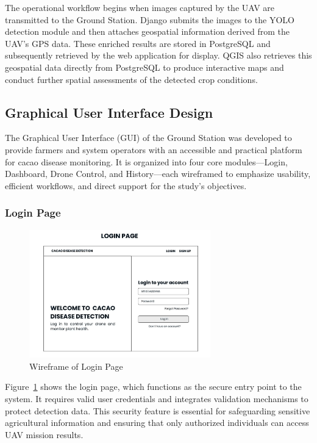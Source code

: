 The operational workflow begins when images captured by the UAV are transmitted to the Ground Station. Django submits the images to the YOLO detection module and then attaches geospatial information derived from the UAV’s GPS data. These enriched results are stored in PostgreSQL and subsequently retrieved by the web application for display. QGIS also retrieves this geospatial data directly from PostgreSQL to produce interactive maps and conduct further spatial assessments of the detected crop conditions.

\subsection*{Graphical User Interface Design}

The Graphical User Interface (GUI) of the Ground Station was developed to provide farmers and system operators with an accessible and practical platform for cacao disease monitoring. It is organized into four core modules—Login, Dashboard, Drone Control, and History—each wireframed to emphasize usability, efficient workflows, and direct support for the study’s objectives.

\subsubsection*{Login Page}

\begin{figure}[H]
	\centering
	\caption{Wireframe of Login Page}
	\label{fig:LoginGUI}
	\includegraphics[width=0.7\textwidth]{figures/Login.pdf}
\end{figure}

Figure~\ref{fig:LoginGUI} shows the login page, which functions as the secure entry point to the system. It requires valid user credentials and integrates validation mechanisms to protect detection data. This security feature is essential for safeguarding sensitive agricultural information and ensuring that only authorized individuals can access UAV mission results.

